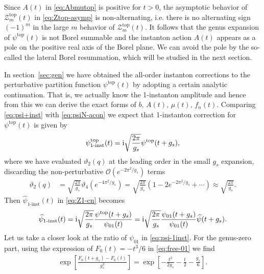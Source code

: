 \documentclass[11pt]{article}
\newcommand{\ri}{{\rm i}}
\def\h#1{\widehat{#1}}
\def\rt#1{\sqrt{#1}}
\newcommand{\Ztop}{\mathcal{Z}^{\text{top}}}
\renewcommand{\[}{\begin{eqnarray}}
\renewcommand{\]}{\end{eqnarray}}
\newcommand{\varth}{\vartheta}
\newcommand{\Atop}{A}
\newcommand{\btop}{b}
\newcommand{\ftop}{f}
\newcommand{\mutop}{\mu}
\begin{document}
Since $A(t)$ in \eqref{eq:Abmutop} is positive for $t>0$, the asymptotic behavior
of $\Ztop_m(t)$ in \eqref{eq:Ztop-asymp} is non-alternating, i.e. there is no
alternating sign $(-1)^m$ in the large $m$ behavior of $\Ztop_m(t)$.
It follows that the genus expansion of $\psi^{\text{top}}(t)$ is not Borel summable
and the instanton action $A(t)$ appears as a pole on the positive real axis of
the Borel plane.
We can avoid the pole by the so-called the lateral Borel resummation, which will be studied
in the next section.


In section~\ref{sec:gen}
we have obtained
the all-order instanton corrections to 
the perturbative partition function $\psi^{\text{top}}(t)$
by adopting a certain analytic continuation.
That is, we actually know the 1-instanton amplitude
and hence from this we can derive the exact forms of
$\btop,\, \Atop(t),\,\mutop(t),\,\ftop_n(t)$.
Comparing \eqref{eq:psi+inst} with \eqref{eq:psiN-acon} we expect that
1-instanton correction for $\psi^{\text{top}}(t)$ is given by
%
\begin{align}
 \psi^{\text{top}}_{\text{1-inst}}(t)
 =\ri\rt{\frac{2\pi}{g_s}}\psi^{\text{top}}(t+g_s),
\end{align}
%
where we have evaluated $\varth_2(q)$ at the leading order
in the small $g_s$ expansion,
discarding the non-perturbative $\mathcal{O}(e^{-2\pi^2/g_s})$
terms
%
\begin{align}
\varth_2(q)
&=\sqrt{\frac{2\pi}{g_s}}\varth_4\left(e^{-4\pi^2/g_s}\right)
 =\sqrt{\frac{2\pi}{g_s}}\left(1-2e^{-2\pi^2/g_s}+\cdots\right)
 \approx\sqrt{\frac{2\pi}{g_s}}.
\label{eq:th2-approx}
\end{align}
%
Then $\h{\psi}_{\text{1-inst}}(t)$
in \eqref{eq:Z1-cn} becomes
\begin{equation}
\begin{aligned}
  \h{\psi}_{\text{1-inst}}(t)
=\ri\rt{\frac{2\pi}{g_s}}\frac{\psi^{\text{top}}(t+g_s)}{\psi_{01}(t)}
=\ri\rt{\frac{2\pi}{g_s}}\frac{\psi_{01}(t+g_s)}{\psi_{01}(t)}
  \h{\psi}(t+g_s).
\end{aligned} 
\label{eq:psi-1inst}
\end{equation}
Let us take a closer look at the ratio of $\psi_{01}$
in \eqref{eq:psi-1inst}. For the genus-zero part,
using the expression of 
$F_0(t)=-t^3/6$ in \eqref{eq:free-01} we find
\begin{equation}
\begin{aligned}
 \exp\left[\frac{F_0(t+g_s)-F_0(t)}{g_s^2}\right]
=\exp\left[-\frac{t^2}{2g_s}-\frac{t}{2}-\frac{g_s}{6}\right].
\end{aligned} 
\end{equation}
\end{document}

